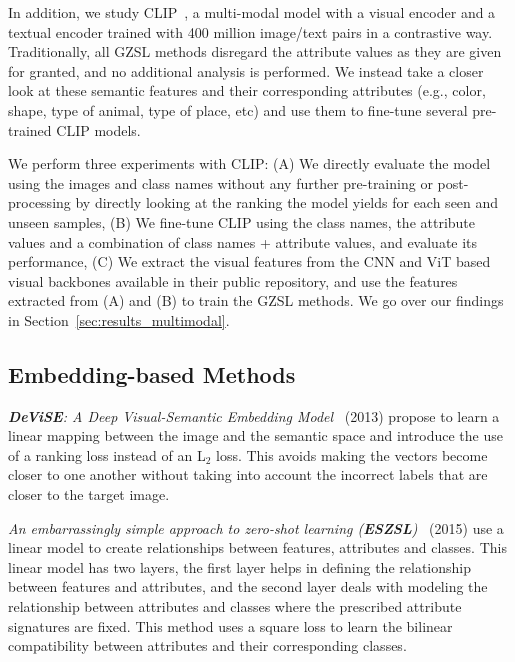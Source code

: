 In addition, we study CLIP~\cite{CLIP}, a multi-modal model with a visual encoder and a textual encoder trained with 400 million image/text pairs in a contrastive way. Traditionally, all GZSL methods disregard the attribute values as they are given for granted, and no additional analysis is performed. We instead take a closer look at these semantic features and their corresponding attributes (e.g., color, shape, type of animal, type of place, etc)  and use them to fine-tune several pre-trained CLIP models. 

We perform three experiments with CLIP: 
(A) We directly evaluate the model using the images and class names without any further pre-training or post-processing by directly looking at the ranking the model yields for each seen and unseen samples,
(B) We fine-tune CLIP using the class names, the attribute values and a combination of class names + attribute values, and evaluate its performance, 
(C) We extract the visual features from the CNN and ViT based visual backbones available in their public repository, and use the features extracted from (A) and (B) to train the GZSL methods.
We go over our findings in Section~\ref{sec:results_multimodal}.









\subsection{Embedding-based Methods}

\textit{\textbf{DeViSE}: A Deep Visual-Semantic Embedding Model}~\cite{DeViSE} (2013) propose to learn a linear mapping between the image and the semantic space and introduce the use of a ranking loss instead of an L$_2$ loss. This avoids making the vectors become closer to one another without taking into account the incorrect labels that are closer to the target image.

\textit{An embarrassingly simple approach to zero-shot learning (\textbf{ESZSL})}~\cite{ESZSL} (2015) use a linear model to create relationships between features, attributes and classes. This linear model has two layers, the first layer  helps in defining the relationship between features and attributes, and the second layer deals with modeling the relationship between attributes and classes where the prescribed attribute signatures are fixed. This method uses a square loss to learn the bilinear compatibility between attributes and their corresponding classes. 

